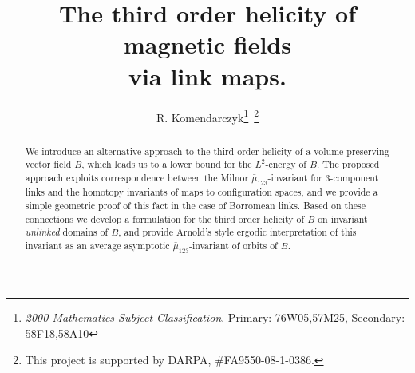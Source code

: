 \documentclass[12pt]{article}
\title{The third order helicity of magnetic fields\\ via link maps.}
\author{R. Komendarczyk\footnote{\emph{2000 Mathematics Subject Classification}. Primary: 76W05,57M25, Secondary: 58F18,58A10
}\ \footnote{
  This project is supported  by DARPA, \#FA9550-08-1-0386.}
}
\numberwithin{equation}{section}
\newcommand{\no}{\noindent}
\begin{document}
\maketitle

\begin{abstract}
 \no We introduce an alternative approach to the third order helicity of a volume preserving vector field $B$, which leads us to a lower bound for the $L^2$-energy of $B$. The proposed approach exploits correspondence between the Milnor $\bar{\mu}_{123}$-invariant for 3-component links and the homotopy invariants of maps to configuration spaces, and we provide a simple geometric proof of this fact in the case of Borromean links. 
 Based on these connections we develop a formulation for the third order helicity of $B$ on invariant \emph{unlinked} domains of $B$, and 
 provide Arnold's style ergodic interpretation of this invariant
 as an average asymptotic $\bar{\mu}_{123}$-invariant of orbits of $B$. 
\end{abstract} 


\end{document}
